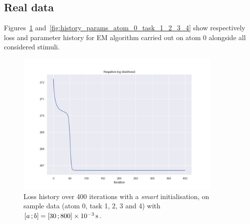 \subsection{Real data}\label{annexe:extra_results_real}

Figures~\ref{fig:history_loss_atom_0_task_1_2_3_4} and~\ref{fig:history_params_atom_0_task_1_2_3_4} show respectively loss and parameter history for EM algorithm carried out on atom 0 alongside all considered stimuli.

\begin{figure}[h!]
    \centering
    \includegraphics[width=0.9\textwidth]{pics/results_sample/history_loss_atom_0_task_1_2_3_4.jpg}
    \caption{Loss history over 400 iterations with a \textit{smart} initialisation, on sample data (atom 0, task 1, 2, 3 and 4) with $\left[ a \, ; b \right] = \left[ 30 \, ; 800 \right]\times \SI{e-3}{\second}$.}
    \label{fig:history_loss_atom_0_task_1_2_3_4}
\end{figure}

